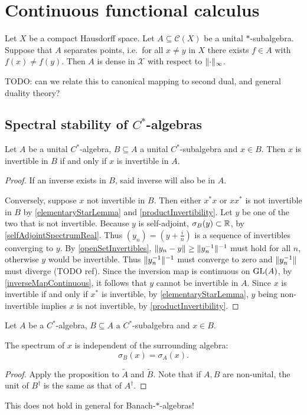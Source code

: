 \section{Continuous functional calculus}

\begin{theorem} \label{StoneWeierstrass}
Let $X$ be a compact Hausdorff space. Let $A\subseteq \mathcal{C}(X)$ be a unital $*$-subalgebra. Suppose that $A$ separates points, i.e.\ for all $x\neq y$ in $X$ there exists $f\in A$ with $f(x) \neq f(y)$. Then $A$ is dense in $\mathcal{X}$ with respect to $\lVert\cdot\rVert_\infty$.
\end{theorem}
TODO: can we relate this to canonical mapping to second dual, and general duality theory?

\subsection{Spectral stability of $C^*$-algebras}
\begin{proposition}
Let $A$ be a unital $C^*$-algebra, $B\subseteq A$ a unital $C^*$-subalgebra and $x\in B$. Then $x$ is invertible in $B$ \textup{if and only if} $x$ is invertible in $A$.
\end{proposition}
\begin{proof}
If an inverse exists in $B$, said inverse will also be in $A$.

Conversely, suppose $x$ not invertible in $B$. Then either $x^*x$ or $xx^*$ is not invertible in $B$ by \ref{elementaryStarLemma} and \ref{productInvertibility}. Let $y$ be one of the two that is not invertible. Because $y$ is self-adjoint, $\sigma_B(y)\subset \mathbb{R}$, by \ref{selfAdjointSpectrumReal}. Thus $(y_n) = (y+\frac{i}{n})$ is a sequence of invertibles converging to $y$. By \ref{openSetInvertibles}, $\lVert y_n - y\rVert\geq \lVert y_n^{-1}\rVert^{-1}$ must hold for all $n$, otherwise $y$ would be invertible. Thus $\lVert y_n^{-1}\rVert^{-1}$ must converge to zero and $\lVert y_n^{-1}\rVert$ must diverge (TODO ref). Since the inversion map is continuous on $\operatorname{GL}(A)$, by \ref{inverseMapContinuous}, it follows that $y$ cannot be invertible in $A$. Since $x$ is invertible if and only if $x^*$ is invertible, by \ref{elementaryStarLemma}, $y$ being non-invertible implies $x$ is not invertible, by \ref{productInvertibility}.
\end{proof}
\begin{corollary} \label{spectrumIndependentOfSurroundingAlgebra}
Let $A$ be a $C^*$-algebra, $B\subseteq A$ a $C^*$-subalgebra and $x\in B$.

The spectrum of $x$ is independent of the surrounding algebra:
\[ \sigma_B(x) = \sigma_A(x). \]
\end{corollary}
\begin{proof}
Apply the proposition to $\tilde{A}$ and $\tilde{B}$. Note that if $A,B$ are non-unital, the unit of $B^\dagger$ is the same as that of $A^\dagger$.
\end{proof}
This does not hold in general for Banach-$*$-algebras!

